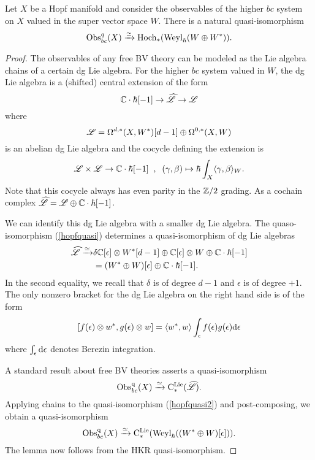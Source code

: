 \def\Cl{{\rm Cl}}

\begin{lem}
Let $X$ be a Hopf manifold and consider the observables of the higher $bc$ system on $X$ valued in the super vector space $W$. 
There is a natural quasi-isomorphism
\[
{\rm Obs}^q_{bc}(X) \xrightarrow{\simeq} {\rm Hoch}_*({\rm Weyl}_\hbar(W \oplus W^*)) .
\]
\end{lem}
\begin{proof}

The observables of any free BV theory can be modeled as the Lie algebra chains of a certain dg Lie algebra. 
For the higher $bc$ system valued in $W$, the dg Lie algebra is a (shifted) central extension of the form
\[
\mathbb C \cdot \hbar [-1] \to \widehat{\mathscr L} \to \mathscr L
\]
where
\[
\mathscr L = \Omega^{d,*}(X, W^*)[d-1] \oplus \Omega^{0,*}(X, W)
\]
is an abelian dg Lie algebra and the cocycle defining the extension is
\[
\mathscr L \times \mathscr L \to \mathbb C \cdot \hbar [-1] \;\; , \;\; (\gamma, \beta) \mapsto \hbar \int_X \langle\gamma, \beta\rangle_W .
\] 
Note that this cocycle always has even parity in the $\mathbb Z/2$ grading.  
As a cochain complex $\widehat{\mathscr L} = \mathscr L \oplus \mathbb C\cdot \hbar [-1]$. 

We can identify this dg Lie algebra with a smaller dg Lie algebra.
The quaso-isomorphism (\ref{hopfquasi}) determines a quasi-isomorphism of dg Lie algebras
\begin{align}\label{hopfquasi2}
\widehat{\mathscr L} \xrightarrow{\simeq} & \delta \mathbb C[\epsilon] \otimes W^* [d-1] \oplus \mathbb C[\epsilon] \otimes W \oplus \mathbb C \cdot \hbar [-1] \\ & = (W^* \oplus W) [\epsilon] \oplus \mathbb C \cdot \hbar [-1] .
\end{align}
In the second equality, we recall that $\delta$ is of degree $d-1$ and $\epsilon$ is of degree $+1$.
The only nonzero bracket for the dg Lie algebra on the right hand side is of the form
\[
[f(\epsilon) \otimes w^* , g(\epsilon) \otimes w] = \langle w^*, w\rangle \int_{\epsilon} f (\epsilon) g(\epsilon) {\rm d} \epsilon
\]
where $\int_{\epsilon} {\rm d} \epsilon$ denotes Berezin integration. 

A standard result about free BV theories asserts a quasi-isomorphism
\[
{\rm Obs}^{{\rm q}}_{bc} (X) \xrightarrow{\simeq} {\rm C}^{\rm Lie}_*(\widehat{\mathscr L}) .
\] 
Applying chains to the quasi-isomorphism (\ref{hopfquasi2}) and post-composing, we obtain a quasi-isomorphism
\[
{\rm Obs}^{\rm q}_{bc} (X) \xrightarrow{\simeq} {\rm C}^{\rm Lie}_*({\rm Weyl}_\hbar((W^* \oplus W) [\epsilon])) .
\] 
The lemma now follows from the HKR quasi-isomorphism. 
\end{proof}

